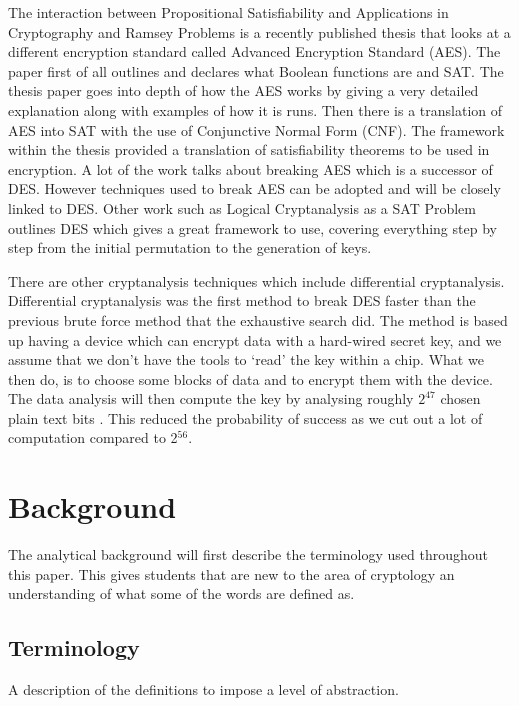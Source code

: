 \documentclass[11pt,a4paper]{report}
\begin{document}
The interaction between Propositional Satisfiability and Applications in Cryptography and Ramsey Problems \cite{Gwynne2010Interaction} is a recently published thesis that looks at a different encryption standard called Advanced Encryption Standard (AES). The paper first of all outlines and declares what Boolean functions are and SAT. The thesis paper goes into depth of how the AES works by giving a very detailed explanation along with examples of how it is runs. Then there is a translation of AES into SAT with the use of Conjunctive Normal Form (CNF). The framework within the thesis provided a translation of satisfiability theorems to be used in encryption. A lot of the work talks about breaking AES which is a successor of DES. However techniques used to break AES can be adopted and will be closely linked to DES.
Other work such as Logical Cryptanalysis as a SAT Problem \cite{Fabio2000LogicalSAT} outlines DES which gives a great framework to use, covering everything step by step from the initial permutation to the generation of keys.

There are other cryptanalysis techniques which include differential cryptanalysis. Differential cryptanalysis was the first method to break DES faster than the previous brute force method that the exhaustive search did. The method is based up having a device which can encrypt data with a hard-wired secret key, and we assume that we don't have the tools to `read' the key within a chip. What we then do, is to choose some blocks of data and to encrypt them with the device. The data analysis will then compute the key by analysing roughly $2^{47}$ chosen plain text bits \cite{Junod2013LASEC}. This reduced  the probability of success as we cut out a lot of computation compared to 2$^{56}$.




\chapter{Background}
\label{cha:AnBack}

The analytical background will first describe the terminology used throughout this paper. This gives students that are new to the area of cryptology an understanding of what some of the words are defined as.


\section{Terminology}
\label{sec:Term}
A description of the definitions to impose a level of abstraction.
\end{document}
